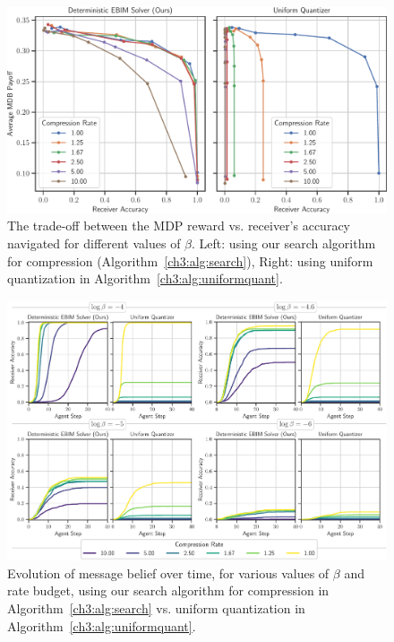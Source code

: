 \begin{figure}
    \centering
    \includegraphics[width=\linewidth]{figs/ch3/tradeoff.pdf}
    \caption{
    The trade-off between the MDP reward vs. receiver's accuracy navigated for different values of $\beta$. Left: using our search algorithm for compression (Algorithm~\ref{ch3:alg:search}), Right: using uniform quantization in Algorithm~\ref{ch3:alg:uniformquant}.
    }
    \label{ch3:fig:tradeoff}
\end{figure}

\begin{figure}
    \centering
    \includegraphics[width=\textwidth]{figs/ch3/accvssteps3.pdf}
    \vspace{1pt}
    \caption{Evolution of message belief over time, for various values of $\beta$ and rate budget, using our search algorithm for compression in Algorithm~\ref{ch3:alg:search} vs. uniform quantization in Algorithm~\ref{ch3:alg:uniformquant}.}
    
    \label{ch3:fig:accvssteps}
\end{figure}

